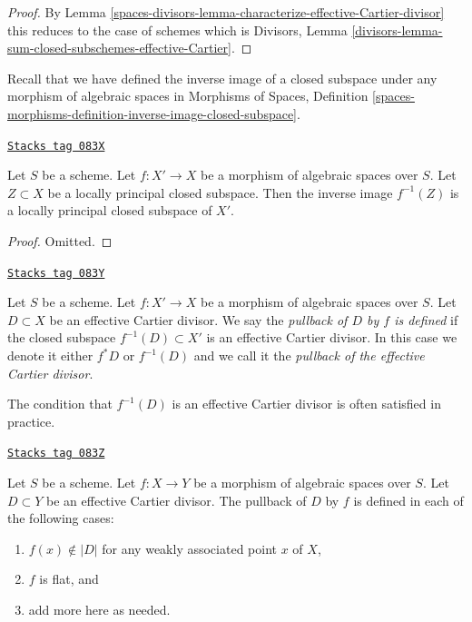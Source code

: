 \begin{proof}
By Lemma \ref{spaces-divisors-lemma-characterize-effective-Cartier-divisor}
this reduces to the case of schemes which is
Divisors, Lemma \ref{divisors-lemma-sum-closed-subschemes-effective-Cartier}.
\end{proof}

Recall that we have defined the inverse image of a closed subspace
under any morphism of algebraic spaces in
Morphisms of Spaces, Definition
\ref{spaces-morphisms-definition-inverse-image-closed-subspace}.

\begin{lemma}
\label{spaces-divisors-lemma-pullback-locally-principal}
\href{https://stacks.math.columbia.edu/tag/083X}{\texttt{Stacks tag 083X}}

Let $S$ be a scheme.
Let $f : X' \to X$ be a morphism of algebraic spaces over $S$.
Let $Z \subset X$ be a locally principal closed subspace.
Then the inverse image $f^{-1}(Z)$ is a locally principal closed
subspace of $X'$.
\end{lemma}

\begin{proof}
Omitted.
\end{proof}

\begin{definition}
\label{spaces-divisors-definition-pullback-effective-Cartier-divisor}
\href{https://stacks.math.columbia.edu/tag/083Y}{\texttt{Stacks tag 083Y}}

Let $S$ be a scheme.
Let $f : X' \to X$ be a morphism of algebraic spaces over $S$.
Let $D \subset X$
be an effective Cartier divisor. We say the {\it pullback of
$D$ by $f$ is defined} if the closed subspace $f^{-1}(D) \subset X'$
is an effective Cartier divisor. In this case we denote it either
$f^*D$ or $f^{-1}(D)$ and we call it the
{\it pullback of the effective Cartier divisor}.
\end{definition}

The condition that $f^{-1}(D)$ is an effective Cartier divisor
is often satisfied in practice.

\begin{lemma}
\label{spaces-divisors-lemma-pullback-effective-Cartier-defined}
\href{https://stacks.math.columbia.edu/tag/083Z}{\texttt{Stacks tag 083Z}}

Let $S$ be a scheme.
Let $f : X \to Y$ be a morphism of algebraic spaces over $S$.
Let $D \subset Y$ be an effective Cartier divisor.
The pullback of $D$ by $f$ is defined in each of the following cases:
\begin{enumerate}
\item $f(x) \not \in |D|$ for any weakly associated point $x$ of $X$,
\item $f$ is flat, and
\item add more here as needed.
\end{enumerate}
\end{lemma}

